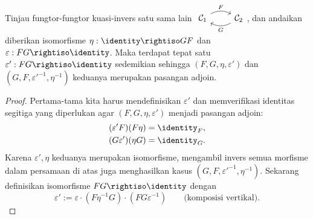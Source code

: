 \begin{theorem} \label{prop:adjoint-equivalence}
	Tinjau fungtor-fungtor kuasi-invers satu sama lain
	$\begin{tikzcd}
		\mathcal{C}_1 \arrow[r, bend left, "F"] & \mathcal{C}_2 \arrow[l, bend left, "G"]
	\end{tikzcd}$, dan andaikan diberikan isomorfisme $\eta: \identity \rightiso GF$ dan $\varepsilon: FG \rightiso \identity$. Maka terdapat tepat satu $\varepsilon': FG \rightiso \identity$ sedemikian sehingga $(F, G, \eta, \varepsilon')$ dan $(G, F, \varepsilon'^{-1}, \eta^{-1})$ keduanya merupakan pasangan adjoin.
\end{theorem}
\begin{proof}
	Pertama-tama kita harus mendefinisikan $\varepsilon'$ dan memverifikasi identitas segitiga yang diperlukan agar $(F, G, \eta, \varepsilon')$ menjadi pasangan adjoin:
	\begin{align}
		\label{eqn:adj-zigzag-1} (\varepsilon' F)(F\eta) & = \identity_F, \\
		\label{eqn:adj-zigzag-2} (G\varepsilon')(\eta G) & = \identity_G.
	\end{align}
	Karena $\varepsilon', \eta$ keduanya merupakan isomorfisme, mengambil invers semua morfisme dalam persamaan di atas juga menghasilkan kasus $(G, F, \varepsilon'^{-1}, \eta^{-1})$. Sekarang definisikan isomorfisme $FG \rightiso \identity$ dengan
	\[ \varepsilon' := \varepsilon \cdot (F\eta^{-1}G) \cdot (FG\varepsilon^{-1}) \qquad \text{(komposisi vertikal)}. \]


\end{proof}
